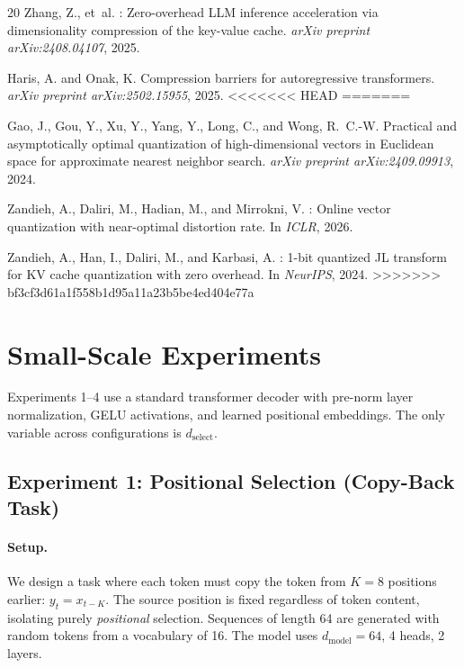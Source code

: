 \documentclass{article} %
\newcommand{\dmodel}{d_{\text{model}}}
\newcommand{\dselect}{d_{\text{select}}}
\begin{document}
\begin{thebibliography}{20}
Zhang, Z., et~al.
: Zero-overhead {LLM} inference acceleration via dimensionality compression of the key-value cache.
\newblock \emph{arXiv preprint arXiv:2408.04107}, 2025.

Haris, A. and Onak, K.
\newblock Compression barriers for autoregressive transformers.
\newblock \emph{arXiv preprint arXiv:2502.15955}, 2025.
<<<<<<< HEAD
=======

Gao, J., Gou, Y., Xu, Y., Yang, Y., Long, C., and Wong, R.~C.-W.
\newblock Practical and asymptotically optimal quantization of high-dimensional vectors in {E}uclidean space for approximate nearest neighbor search.
\newblock \emph{arXiv preprint arXiv:2409.09913}, 2024.

Zandieh, A., Daliri, M., Hadian, M., and Mirrokni, V.
: Online vector quantization with near-optimal distortion rate.
\newblock In \emph{ICLR}, 2026.

Zandieh, A., Han, I., Daliri, M., and Karbasi, A.
: 1-bit quantized {JL} transform for {KV} cache quantization with zero overhead.
\newblock In \emph{NeurIPS}, 2024.
>>>>>>> bf3cf3d61a1f558b1d95a11a23b5be4ed404e77a

\end{thebibliography}


\appendix

\section{Small-Scale Experiments}\label{app:small_scale}

Experiments 1--4 use a standard transformer decoder with pre-norm layer normalization, GELU activations, and learned positional embeddings. The only variable across configurations is $\dselect$.

\subsection{Experiment 1: Positional Selection (Copy-Back Task)}

\paragraph{Setup.}
We design a task where each token must copy the token from $K=8$ positions earlier: $y_t = x_{t-K}$. The source position is fixed regardless of token content, isolating purely \emph{positional} selection. Sequences of length 64 are generated with random tokens from a vocabulary of 16. The model uses $\dmodel = 64$, 4 heads, 2 layers.
\end{document}
